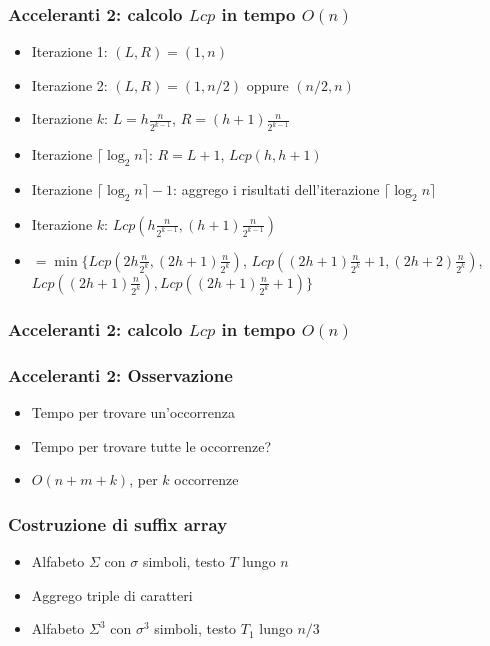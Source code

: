 \begin{frame}[fragile]
\frametitle{Acceleranti 2: calcolo $Lcp$ in tempo $O(n)$}
\begin{itemize}[<+->]
\item
Iterazione 1: $(L,R)=(1,n)$
\item
Iterazione 2: $(L,R)=(1,n/2)$ oppure $(n/2,n)$
\item
Iterazione $k$: $L = h\frac{n}{2^{k-1}}$, $R = (h+1)\frac{n}{2^{k-1}}$
\item
Iterazione $\lceil \log_{2}n\rceil$: $R=L+1$, $Lcp(h,h+1)$
\item
Iterazione $\lceil \log_{2}n\rceil -1$: aggrego i risultati dell'iterazione
$\lceil \log_{2}n\rceil$
\item
Iterazione $k$: $Lcp(h\frac{n}{2^{k-1}}, (h+1)\frac{n}{2^{k-1}})$
\item
$=\min\{Lcp(2h\frac{n}{2^{k}}, (2h+1)\frac{n}{2^{k}})$,
$Lcp((2h+1)\frac{n}{2^{k}}+1, (2h+2)\frac{n}{2^{k}})$,
$Lcp((2h+1)\frac{n}{2^{k}}), Lcp((2h+1)\frac{n}{2^{k}}+1)\}$
\end{itemize}
\end{frame}


\begin{frame}[fragile]
\frametitle{Acceleranti 2: calcolo $Lcp$ in tempo $O(n)$}
\end{frame}

\begin{frame}
\frametitle{Acceleranti 2: Osservazione}
\begin{itemize}[<+->]
\item
Tempo per trovare un'occorrenza
\item
Tempo per trovare tutte le occorrenze?
\item
$O(n+m+k)$, per $k$ occorrenze
\end{itemize}
\end{frame}

\begin{frame}[fragile]
\frametitle{Costruzione di suffix array}
\begin{itemize}
\item
Alfabeto $\Sigma$ con $\sigma$ simboli, testo $T$ lungo $n$
\item
Aggrego triple di caratteri
\item
Alfabeto $\Sigma^{3}$ con $\sigma^{3}$ simboli, testo $T_{1}$ lungo $n/3$
\end{itemize}
\end{frame}






